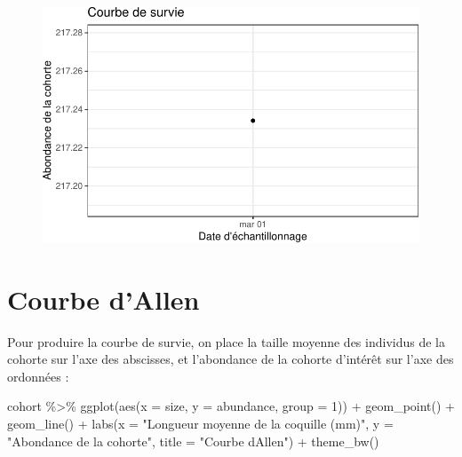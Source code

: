\documentclass[
  a4paper,
  DIV=11,
  numbers=noendperiod,
  oneside]{scrreprt}
\newenvironment{Shaded}{}{}
\newcommand{\AttributeTok}[1]{\textcolor[rgb]{0.84,0.23,0.29}{#1}}
\newcommand{\DecValTok}[1]{\textcolor[rgb]{0.00,0.36,0.77}{#1}}
\newcommand{\FunctionTok}[1]{\textcolor[rgb]{0.44,0.26,0.76}{#1}}
\newcommand{\NormalTok}[1]{\textcolor[rgb]{0.14,0.16,0.18}{#1}}
\newcommand{\SpecialCharTok}[1]{\textcolor[rgb]{0.00,0.36,0.77}{#1}}
\newcommand{\StringTok}[1]{\textcolor[rgb]{0.01,0.18,0.38}{#1}}
\begin{document}
\begin{figure}[H]


{\centering \includegraphics{04-Cohortes_files/figure-pdf/fig-survie-1.pdf}

}

\end{figure}

\hypertarget{courbe-dallen}{%
\section{Courbe d'Allen}\label{courbe-dallen}}

Pour produire la courbe de survie, on place la taille moyenne des
individus de la cohorte sur l'axe des abscisses, et l'abondance de la
cohorte d'intérêt sur l'axe des ordonnées :

\begin{Shaded}
\begin{Highlighting}[]
\NormalTok{cohort }\SpecialCharTok{\%\textgreater{}\%}
  \FunctionTok{ggplot}\NormalTok{(}\FunctionTok{aes}\NormalTok{(}\AttributeTok{x =}\NormalTok{ size, }\AttributeTok{y =}\NormalTok{ abundance, }\AttributeTok{group =} \DecValTok{1}\NormalTok{)) }\SpecialCharTok{+}
  \FunctionTok{geom\_point}\NormalTok{() }\SpecialCharTok{+}
  \FunctionTok{geom\_line}\NormalTok{() }\SpecialCharTok{+}
  \FunctionTok{labs}\NormalTok{(}\AttributeTok{x =} \StringTok{"Longueur moyenne de la coquille (mm)"}\NormalTok{,}
       \AttributeTok{y =} \StringTok{"Abondance de la cohorte"}\NormalTok{,}
       \AttributeTok{title =} \StringTok{"Courbe d\textquotesingle{}Allen"}\NormalTok{) }\SpecialCharTok{+}
  \FunctionTok{theme\_bw}\NormalTok{()}
\end{Highlighting}
\end{Shaded}
\end{document}
